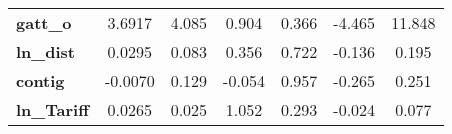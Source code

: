 \begin{center}
\begin{tabular}{lcccccc}
\textbf{gatt\_o}                                                   &       3.6917  &        4.085     &     0.904  &         0.366        &       -4.465    &       11.848     \\
\textbf{ln\_dist}                                                  &       0.0295  &        0.083     &     0.356  &         0.722        &       -0.136    &        0.195     \\
\textbf{contig}                                                    &      -0.0070  &        0.129     &    -0.054  &         0.957        &       -0.265    &        0.251     \\
\textbf{ln\_Tariff}                                                &       0.0265  &        0.025     &     1.052  &         0.293        &       -0.024    &        0.077     \\
\bottomrule
\end{tabular}
\end{center}